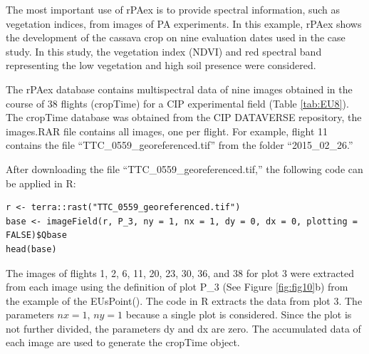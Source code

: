 The most important use of rPAex is to provide spectral information, such as vegetation indices, from images of PA experiments. In this example, rPAex shows the development of the cassava crop on nine evaluation dates used in the case study. In this study, the vegetation index (NDVI) and red spectral band representing the low vegetation and high soil presence were considered.

The rPAex database contains multispectral data of nine images obtained in the course of 38 flights (cropTime) for a CIP experimental field (Table \ref{tab:EU8}). The cropTime database was obtained from the CIP DATAVERSE repository, the images.RAR file contains all images, one per flight. For example, flight 11 contains the file ``TTC\_0559\_georeferenced.tif'' from the folder ``2015\_02\_26.''

After downloading the file ``TTC\_0559\_georeferenced.tif,'' the following code can be applied in R:

\begin{verbatim}
r <- terra::rast("TTC_0559_georeferenced.tif")  
base <- imageField(r, P_3, ny = 1, nx = 1, dy = 0, dx = 0, plotting = FALSE)$Qbase 
head(base)
\end{verbatim}

The images of flights 1, 2, 6, 11, 20, 23, 30, 36, and 38 for plot 3 were extracted from each image using the definition of plot P\_3 (See Figure \ref{fig:fig10}b) from the example of the EUsPoint(). The code in R extracts the data from plot 3. The parameters \(nx = 1\), \(ny = 1\) because a single plot is considered. Since the plot is not further divided, the parameters dy and dx are zero. The accumulated data of each image are used to generate the cropTime object.

